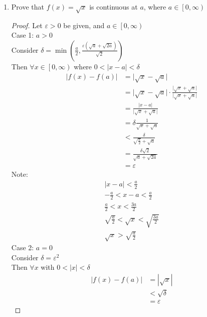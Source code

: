 \documentclass[12pt]{article}
\begin{document}
\begin{enumerate}
\begin{enumerate}
\begin{proof}
\begin{gather*}
                    3 > c
                  \end{gather*}
                  so $|x-3| = 3-x > \frac{6-2c-|c-3|}{2}$
              \end{proof}
          \end{enumerate}
          \item Prove that $f(x) = \sqrt{x}$ is continuous at $a$, where $a \in \left[0, \infty\right)$
          \begin{proof}
              Let $\varepsilon > 0$ be given, and $a \in \left[ 0, \infty \right)$ \\
              Case 1: $a > 0$ \\
              Consider $\delta = \min(\frac{a}{2},\frac{\varepsilon(\sqrt{a} + \sqrt{2a})}{\sqrt{2}})$ \\
              Then $\forall x \in \left[ 0, \infty \right) $ where $0 < |x-a| < \delta$
              \begin{align*}
                  |f(x) - f(a)| &= \Big| \sqrt{x} - \sqrt{a} \Big| \\
                  &= \Big| \sqrt{x} - \sqrt{a} \Big| \cdot \frac{\Big| \sqrt{x} + \sqrt{a} \Big|}{\Big| \sqrt{x} + \sqrt{a} \Big|} \\
                  &= \frac{| x-a |}{\Big| \sqrt{x} + \sqrt{a} \Big|} \\
                  &= \delta \frac{1}{\sqrt{x} + \sqrt{a}} \\
                  &< \frac{\delta}{\sqrt{\frac{a}{2}} + \sqrt{a}} \\
                  &= \frac{\delta \sqrt{2}}{\sqrt{a} + \sqrt{2a}} \\
                  &= \varepsilon
              \end{align*}
              Note:
              \begin{gather*}
                  |x-a| < \frac{a}{2} \\
                  -\frac{a}{2} < x-a < \frac{a}{2} \\
                  \frac{a}{2} < x < \frac{3a}{2} \\
                  \sqrt{\frac{a}{2}} < \sqrt{x} < \sqrt{\frac{3a}{2}} \\
                  \sqrt{x} > \sqrt{\frac{a}{2}}
              \end{gather*}
              Case 2: $a = 0$ \\
              Consider $\delta = \varepsilon^2$ \\
              Then $\forall x$ with $0 < |x| < \delta$
              \begin{align*}
                  |f(x) - f(a)| &= |\sqrt{x}| \\
                  &< \sqrt{\delta} \\
                  &= \varepsilon
              \end{align*}
          \end{proof}
\end{enumerate}
\end{document}
